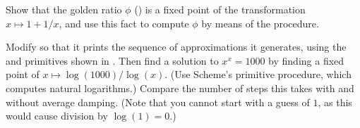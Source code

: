 \begin{exercise}
	\label{Exercise 1.35}
	Show that the golden ratio \( ϕ \) () is a fixed point of the transformation \( x \mapsto 1 + 1 / x \), and use this fact to compute \( ϕ \) by means of the  procedure.
\end{exercise}



\begin{exercise}
	\label{Exercise 1.36}
	Modify  so that it prints the sequence of approximations it generates, using the  and  primitives shown in .
	Then find a solution to \( x^x = 1000 \) by finding a fixed point of \( x \mapsto \log(1000) / \log(x) \).
	(Use Scheme’s primitive  procedure, which computes natural logarithms.)
	Compare the number of steps this takes with and without average damping.
	(Note that you cannot start  with a guess of \( 1 \), as this would cause division by \( \log(1) = 0 \).)
\end{exercise}




